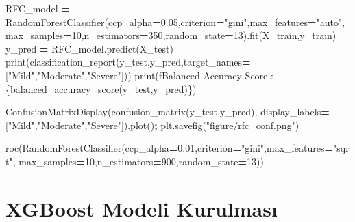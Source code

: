 \documentclass[12pt,twoside]{deuthesis}
\newenvironment{Shaded}{\begin{snugshade}}{\end{snugshade}}
\newcommand{\BuiltInTok}[1]{#1}
\newcommand{\DecValTok}[1]{\textcolor[rgb]{0.00,0.00,0.81}{#1}}
\newcommand{\FloatTok}[1]{\textcolor[rgb]{0.00,0.00,0.81}{#1}}
\newcommand{\NormalTok}[1]{#1}
\newcommand{\OperatorTok}[1]{\textcolor[rgb]{0.81,0.36,0.00}{\textbf{#1}}}
\newcommand{\SpecialCharTok}[1]{\textcolor[rgb]{0.00,0.00,0.00}{#1}}
\newcommand{\SpecialStringTok}[1]{\textcolor[rgb]{0.31,0.60,0.02}{#1}}
\newcommand{\StringTok}[1]{\textcolor[rgb]{0.31,0.60,0.02}{#1}}
\begin{document}
\begin{Shaded}
\begin{Highlighting}[]
\NormalTok{RFC\_model }\OperatorTok{=}\NormalTok{ RandomForestClassifier(ccp\_alpha}\OperatorTok{=}\FloatTok{0.05}\NormalTok{,criterion}\OperatorTok{=}\StringTok{"gini"}\NormalTok{,max\_features}\OperatorTok{=}\StringTok{"auto"}\NormalTok{,}
\NormalTok{                                max\_samples}\OperatorTok{=}\DecValTok{10}\NormalTok{,n\_estimators}\OperatorTok{=}\DecValTok{350}\NormalTok{,random\_state}\OperatorTok{=}\DecValTok{13}\NormalTok{).fit(X\_train,y\_train)}
\NormalTok{y\_pred }\OperatorTok{=}\NormalTok{ RFC\_model.predict(X\_test)}
\BuiltInTok{print}\NormalTok{(classification\_report(y\_test,y\_pred,target\_names}\OperatorTok{=}\NormalTok{[}\StringTok{"Mild"}\NormalTok{,}\StringTok{"Moderate"}\NormalTok{,}\StringTok{"Severe"}\NormalTok{]))}
\BuiltInTok{print}\NormalTok{(}\SpecialStringTok{f\textquotesingle{}Balanced Accuracy Score : }\SpecialCharTok{\{}\NormalTok{balanced\_accuracy\_score(y\_test,y\_pred)}\SpecialCharTok{\}}\SpecialStringTok{\textquotesingle{}}\NormalTok{)}
\end{Highlighting}
\end{Shaded}
\begin{Shaded}
\begin{Highlighting}[]
\NormalTok{ConfusionMatrixDisplay(confusion\_matrix(y\_test,y\_pred),}
\NormalTok{display\_labels}\OperatorTok{=}\NormalTok{[}\StringTok{"Mild"}\NormalTok{,}\StringTok{"Moderate"}\NormalTok{,}\StringTok{"Severe"}\NormalTok{]).plot()}\OperatorTok{;}
\NormalTok{plt.savefig(}\StringTok{"figure/rfc\_conf.png"}\NormalTok{)}
\end{Highlighting}
\end{Shaded}
\begin{Shaded}
\begin{Highlighting}[]
\NormalTok{roc(RandomForestClassifier(ccp\_alpha}\OperatorTok{=}\FloatTok{0.01}\NormalTok{,criterion}\OperatorTok{=}\StringTok{"gini"}\NormalTok{,max\_features}\OperatorTok{=}\StringTok{"sqrt"}\NormalTok{,}
\NormalTok{                                   max\_samples}\OperatorTok{=}\DecValTok{10}\NormalTok{,n\_estimators}\OperatorTok{=}\DecValTok{900}\NormalTok{,random\_state}\OperatorTok{=}\DecValTok{13}\NormalTok{))}
\end{Highlighting}
\end{Shaded}
\normalsize

\hypertarget{xgboost-modeli-kurulmasux131}{%
\section{XGBoost Modeli Kurulması}\label{xgboost-modeli-kurulmasux131}}
\end{document}
